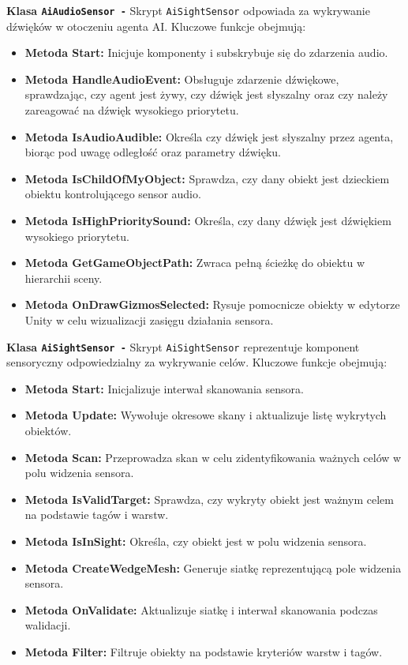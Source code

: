 \textbf{Klasa \texttt{AiAudioSensor -}}
Skrypt \texttt{AiSightSensor} odpowiada za wykrywanie dźwięków w otoczeniu agenta AI. Kluczowe funkcje obejmują:
\begin{itemize}
  \item \textbf{Metoda Start:} Inicjuje komponenty i subskrybuje się do zdarzenia audio.
  \item \textbf{Metoda HandleAudioEvent:} Obsługuje zdarzenie dźwiękowe, sprawdzając, czy agent jest żywy, czy dźwięk jest słyszalny oraz czy należy zareagować na dźwięk wysokiego priorytetu.
  \item \textbf{Metoda IsAudioAudible:} Określa czy dźwięk jest słyszalny przez agenta, biorąc pod uwagę odległość oraz parametry dźwięku.
  \item \textbf{Metoda IsChildOfMyObject:} Sprawdza, czy dany obiekt jest dzieckiem obiektu kontrolującego sensor audio.
  \item \textbf{Metoda IsHighPrioritySound:} Określa, czy dany dźwięk jest dźwiękiem wysokiego priorytetu.
  \item \textbf{Metoda GetGameObjectPath:} Zwraca pełną ścieżkę do obiektu w hierarchii sceny.
  \item \textbf{Metoda OnDrawGizmosSelected:} Rysuje pomocnicze obiekty w edytorze Unity w celu wizualizacji zasięgu działania sensora.
\end{itemize}

\textbf{Klasa \texttt{AiSightSensor -}}
Skrypt \texttt{AiSightSensor} reprezentuje komponent sensoryczny odpowiedzialny za wykrywanie celów. Kluczowe funkcje obejmują:
\begin{itemize}
  \item \textbf{Metoda Start:} Inicjalizuje interwał skanowania sensora.
  \item \textbf{Metoda Update:} Wywołuje okresowe skany i aktualizuje listę wykrytych obiektów.
  \item \textbf{Metoda Scan:} Przeprowadza skan w celu zidentyfikowania ważnych celów w polu widzenia sensora.
  \item \textbf{Metoda IsValidTarget:} Sprawdza, czy wykryty obiekt jest ważnym celem na podstawie tagów i warstw.
  \item \textbf{Metoda IsInSight:} Określa, czy obiekt jest w polu widzenia sensora.
  \item \textbf{Metoda CreateWedgeMesh:} Generuje siatkę reprezentującą pole widzenia sensora.
  \item \textbf{Metoda OnValidate:} Aktualizuje siatkę i interwał skanowania podczas walidacji.
  \item \textbf{Metoda Filter:} Filtruje obiekty na podstawie kryteriów warstw i tagów.
\end{itemize}

